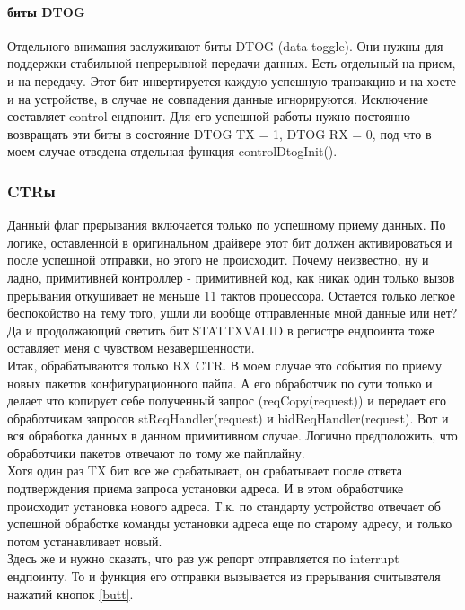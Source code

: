 \documentclass[12pt,a4paper]{article}
\begin{document}
\paragraph{биты DTOG}
    Отдельного внимания заслуживают биты DTOG (data toggle). Они нужны для
    поддержки стабильной непрерывной передачи данных. Есть отдельный на прием, и на
    передачу. Этот бит инвертируется каждую успешную транзакцию и на хосте и на
    устройстве, в случае не совпадения данные игнорируются. Исключение
    составляет control ендпоинт. Для его успешной работы нужно постоянно
    возвращать эти биты в состояние DTOG TX = 1, DTOG RX = 0, под что в моем
    случае отведена отдельная функция controlDtogInit().

\subsubsection{CTRы}
    Данный флаг прерывания включается только по успешному приему данных. По
    логике, оставленной в оригинальном драйвере этот бит должен активироваться
    и после успешной отправки, но этого не происходит. Почему неизвестно, ну и
    ладно, примитивней контроллер - примитивней код, как никак один только
    вызов прерывания откушивает не меньше 11 тактов процессора. Остается только
    легкое беспокойство на тему того, ушли ли вообще отправленные мной данные
    или нет? Да и продолжающий светить бит STAT\textunderscore TX\textunderscore VALID в регистре ендпоинта
    тоже оставляет меня с чувством незавершенности.\\
    Итак, обрабатываются только RX CTR. В моем случае это события по приему
    новых пакетов конфигурационного пайпа. А его обработчик по сути только и
    делает что копирует себе полученный запрос (reqCopy(request)) и передает
    его обработчикам запросов stReqHandler(request) и hidReqHandler(request).
    Вот и вся обработка данных в данном примитивном случае. Логично
    предположить, что обработчики пакетов отвечают по тому же пайплайну.\\
    Хотя один раз TX бит все же срабатывает, он срабатывает после ответа
    подтверждения приема запроса установки адреса. И в этом обработчике
    происходит установка нового адреса. Т.к. по стандарту устройство отвечает
    об успешной обработке команды установки адреса еще по старому адресу, и
    только потом устанавливает новый.\\
    Здесь же и нужно сказать, что раз уж репорт отправляется по interrupt
    ендпоинту. То и функция его отправки вызывается из прерывания считывателя
    нажатий кнопок \ref{butt}.
\end{document}

